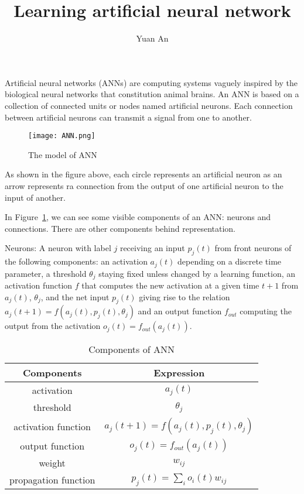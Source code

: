 \documentclass[a4paper,12pt]{article}
\title{Learning artificial neural network}
\author{Yuan An}
\begin{document}
\maketitle
Artificial neural networks\cite{ANNwikipedia} (ANNs) are computing systems vaguely inspired by the biological neural networks that constitution animal brains. An ANN is based on a collection of connected units or nodes named artificial neurons. Each connection between artificial neurons can transmit a signal from one to another. 
\begin{figure}[h]
	\centering
	\texttt{[image: ANN.png]}
	\caption{The model of ANN}\label{ANNmodel}
\end{figure}
\par
As shown in the figure above, each circle represents an artificial neuron as an arrow represents ra connection from the output of one artificial neuron to the input of another.
\par
In Figure~\ref{ANNmodel}, we can see some visible components of an ANN: neurons and connections. There are other components behind representation.
\par
Neurons: A neuron with label $j$ receiving an input $p_j(t)$ from front neurons of the following components: an activation $a_j(t)$ depending on a discrete time parameter, a threshold $\theta_j$ staying fixed unless changed by a learning function, an activation function $f$ that computes the new activation at a given time $t+1$ from $a_j(t)$, $\theta_j$, and the net input $p_j(t)$ giving rise to the relation $a_j(t+1)=f(a_j(t),p_j(t),\theta_j)$ and an output function $f_{out}$ computing the output from the activation $o_j(t)=f_{out}(a_j(t))$. 
\par
\begin{table}[h]
	\centering
	\renewcommand{\arraystretch}{1.1}
	\begin{tabular}{cc}
		\toprule
		Components&Expression\\
		\midrule
		activation&$a_j(t)$\\
		threshold&$\theta_j$\\
		activation function& $a_j(t+1)=f(a_j(t),p_j(t),\theta_j)$\\
		output function& $o_j(t)=f_{out}(a_j(t))$\\
		weight&$w_{ij}$\\
		propagation function&$p_j(t) = \sum\limits_{i}o_i(t)w_{ij}$\\
		\bottomrule
	\end{tabular}
	\caption{Components of ANN}
\end{table}
\end{document}
